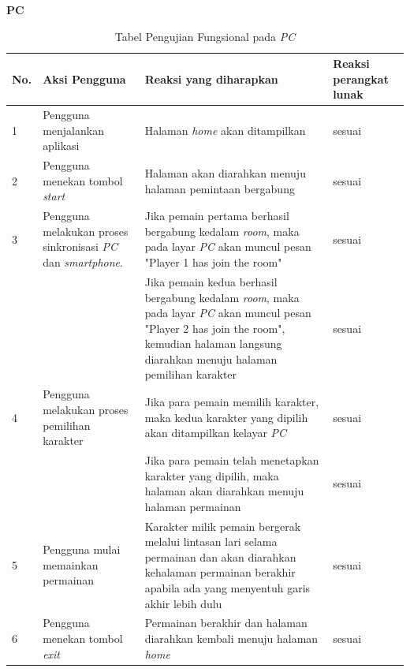 \textbf{PC} \\
\begin{table}[H]
	\centering
	\caption{Tabel Pengujian Fungsional pada \textit{PC}}
	\begin{tabular}{|p{0.35cm}| p{3.5cm}| p{7cm}| p{2.5cm}|} \hline
		No. & Aksi Pengguna & Reaksi yang diharapkan & Reaksi perangkat lunak \\ \hline
		1 & Pengguna menjalankan aplikasi & Halaman \textit{home} akan ditampilkan & sesuai \\ \hline
		2 & Pengguna menekan tombol \textit{start} & Halaman akan diarahkan menuju halaman pemintaan bergabung & sesuai \\ \hline
		3 & Pengguna melakukan proses sinkronisasi \textit{PC} dan \textit{smartphone}. & Jika pemain pertama berhasil bergabung kedalam \textit{room}, maka pada layar \textit{PC} akan muncul pesan "Player 1 has join the room" & sesuai \\ \hline
		&  & Jika pemain kedua berhasil bergabung kedalam \textit{room}, maka pada layar \textit{PC} akan muncul pesan "Player 2 has join the room", kemudian halaman langsung diarahkan menuju halaman pemilihan karakter & sesuai \\ \hline
		4 & Pengguna melakukan proses pemilihan karakter & Jika para pemain memilih karakter, maka kedua karakter yang dipilih akan ditampilkan kelayar \textit{PC} & sesuai \\ \hline
		&  & Jika para pemain telah menetapkan karakter yang dipilih, maka halaman akan diarahkan menuju halaman permainan & sesuai \\ \hline
		5 & Pengguna mulai memainkan permainan & Karakter milik pemain bergerak melalui lintasan lari selama permainan dan akan diarahkan kehalaman permainan berakhir apabila ada yang menyentuh garis akhir lebih dulu & sesuai \\ \hline
		6 & Pengguna menekan tombol \textit{exit} & Permainan berakhir dan halaman diarahkan kembali menuju halaman \textit{home} & sesuai \\ \hline
	\end{tabular}
	\label{table:fungsionalPC}
\end{table} 

